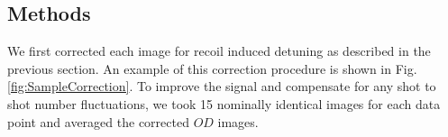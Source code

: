 \documentclass[12pt]{iopart}
\begin{document}
\subsection{Methods}
\par We first corrected each image for recoil induced detuning as described in the previous section. An example of this correction procedure is shown in Fig. \ref{fig:SampleCorrection}.  To improve the signal and compensate for any shot to shot number fluctuations, we took 15 nominally identical images for each data point and averaged the corrected $OD$ images. 
\begin{figure}

\end{figure}
\end{document}
